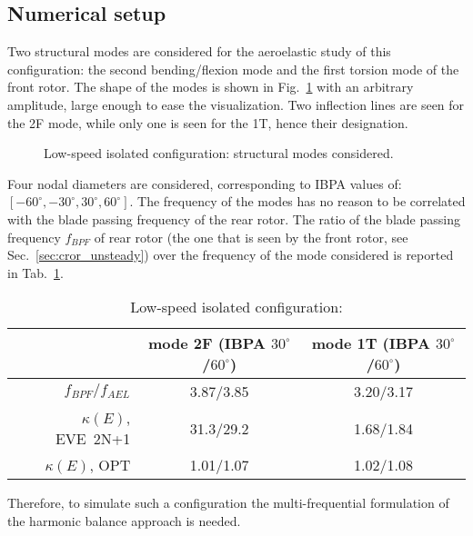 
\subsection{Numerical setup}
\label{sub:dream_ls_ael_numerical}

Two structural modes are considered for the aeroelastic study of this 
configuration: the second bending/flexion mode and the first torsion mode
of the front rotor.
The shape of the modes is shown in Fig.~\ref{fig:dream_ls_ael_modes}
with an arbitrary amplitude, large enough to ease the visualization.
Two inflection lines are seen for the 2F mode, while only
one is seen for the 1T, hence their designation.
\begin{figure}[htp]
  \centering
  \caption{Low-speed isolated configuration: structural modes considered.}
  \label{fig:dream_ls_ael_modes}
\end{figure}

Four nodal diameters are considered, corresponding to IBPA
values of: $[-60^\circ, -30^\circ, 30^\circ, 60^\circ]$. The frequency
of the modes has no reason to be correlated with the blade
passing frequency of the rear rotor. 
The ratio of the
blade passing frequency $f_{BPF}$ of rear rotor (the one that is
seen by the front rotor, see Sec.~\ref{sec:cror_unsteady})
over the frequency of the mode considered is reported in
Tab.~\ref{tab:dream_ls_ael_freq_bpf}. 
\begin{table}[htp]
   \centering
  \begin{tabular}{r|cc}
    \toprule
    &  mode 2F (IBPA $30^\circ$/$60^\circ$) & mode 1T (IBPA $30^\circ$/$60^\circ$) \\
    \midrule
    $f_{BPF} / f_{AEL}$ & 3.87/3.85 & 3.20/3.17 \\ 
    $\kappa (E)$, EVE~2N+1 & 31.3/29.2 & 1.68/1.84 \\
    $\kappa (E)$, OPT & 1.01/1.07 & 1.02/1.08 \\
    \bottomrule
  \end{tabular}
  \caption{Low-speed isolated configuration:}
  \label{tab:dream_ls_ael_freq_bpf}
\end{table} 
Therefore, to simulate such
a configuration the multi-frequential formulation 
of the harmonic balance approach is needed.


